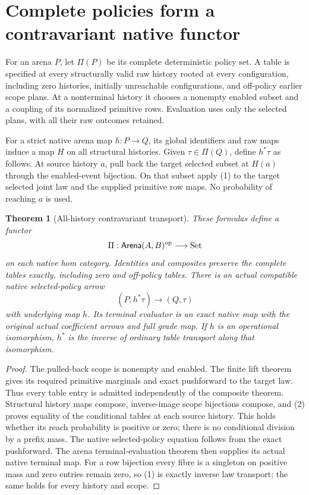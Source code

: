 \documentclass[11pt]{article}
\newtheorem{theorem}{Theorem}\newtheorem{proposition}[theorem]{Proposition}
\begin{document}
\section{Complete policies form a contravariant native functor}
For an arena $P$, let $\Pi(P)$ be its complete deterministic policy set. A table is specified at every structurally valid raw history rooted at every configuration, including zero histories, initially unreachable configurations, and off-policy earlier scope plans. At a nonterminal history it chooses a nonempty enabled subset and a coupling of its normalized primitive rows. Evaluation uses only the selected plans, with all their raw outcomes retained.

For a strict native arena map $h:P\to Q$, its global identifiers and raw maps induce a map $H$ on all structural histories. Given $\tau\in\Pi(Q)$, define $h^*\tau$ as follows. At source history $a$, pull back the target selected subset at $H(a)$ through the enabled-event bijection. On that subset apply (1) to the target selected joint law and the supplied primitive row maps. No probability of reaching $a$ is used.

\begin{theorem}[All-history contravariant transport]
These formulas define a functor
\[
 \Pi:\mathsf{Arena}(A,B)^{\rm op}\longrightarrow\mathrm{Set}
\]
on each native hom category. Identities and composites preserve the complete tables exactly, including zero and off-policy tables. There is an actual compatible native selected-policy arrow
\[
 (P,h^*\tau)\longrightarrow(Q,\tau)
\]
with underlying map $h$. Its terminal evaluator is an exact native map with the original actual coefficient arrows and full grade map. If $h$ is an operational isomorphism, $h^*$ is the inverse of ordinary table transport along that isomorphism.
\end{theorem}
\begin{proof}
The pulled-back scope is nonempty and enabled. The finite lift theorem gives its required primitive marginals and exact pushforward to the target law. Thus every table entry is admitted independently of the composite theorem. Structural history maps compose, inverse-image scope bijections compose, and (2) proves equality of the conditional tables at each source history. This holds whether its reach probability is positive or zero; there is no conditional division by a prefix mass. The native selected-policy equation follows from the exact pushforward. The arena terminal-evaluation theorem then supplies its actual native terminal map. For a row bijection every fibre is a singleton on positive mass and zero entries remain zero, so (1) is exactly inverse law transport; the same holds for every history and scope.\end{proof}
\end{document}
